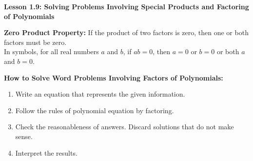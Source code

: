 \begin{center}
\textbf{Lesson 1.9: Solving Problems Involving Special Products and Factoring of Polynomials}
\end{center}

\vspace*{1ex}

\textbf{Zero Product Property:}	If the product of two factors is zero, then one or both factors must be zero.\\
			In symbols, for all real numbers $ a $ and $ b $, if $ ab = 0 $, then $ a = 0 $ or $ b = 0 $ or both $ a $ and $ b = 0 $.

\textbf{How to Solve Word Problems Involving Factors of Polynomials:}
		\begin{enumerate}
			\item Write an equation that represents the given information. 
		    \item Follow the rules of polynomial equation by factoring.
		    \item Check the reasonableness of answers. Discard 
solutions that do not make sense.
		    \item Interpret the results.  
		\end{enumerate}	
